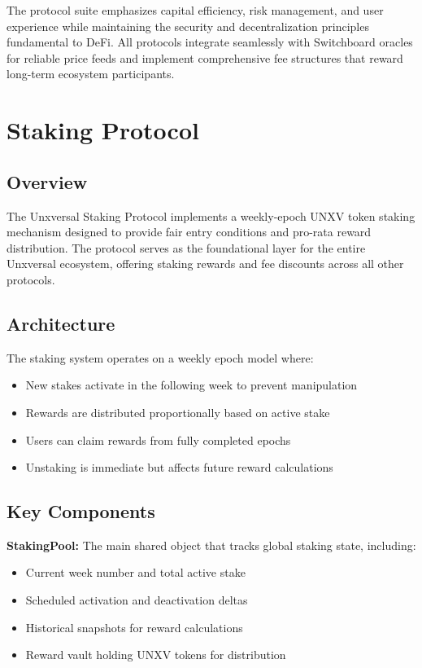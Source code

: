 \documentclass[12pt]{article}
\begin{document}
The protocol suite emphasizes capital efficiency, risk management, and user experience while maintaining the security and decentralization principles fundamental to DeFi. All protocols integrate seamlessly with Switchboard oracles for reliable price feeds and implement comprehensive fee structures that reward long-term ecosystem participants.

\newpage
\tableofcontents

\newpage

\section{Staking Protocol}

\subsection{Overview}

The Unxversal Staking Protocol implements a weekly-epoch UNXV token staking mechanism designed to provide fair entry conditions and pro-rata reward distribution. The protocol serves as the foundational layer for the entire Unxversal ecosystem, offering staking rewards and fee discounts across all other protocols.

\subsection{Architecture}

The staking system operates on a weekly epoch model where:
\begin{itemize}
    \item New stakes activate in the following week to prevent manipulation
    \item Rewards are distributed proportionally based on active stake
    \item Users can claim rewards from fully completed epochs
    \item Unstaking is immediate but affects future reward calculations
\end{itemize}

\subsection{Key Components}

\textbf{StakingPool:} The main shared object that tracks global staking state, including:
\begin{itemize}
    \item Current week number and total active stake
    \item Scheduled activation and deactivation deltas
    \item Historical snapshots for reward calculations
    \item Reward vault holding UNXV tokens for distribution
\end{itemize}
\end{document}
